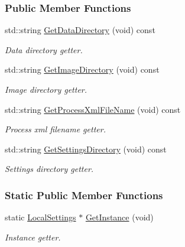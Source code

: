 \subsubsection*{Public Member Functions}
\begin{DoxyCompactItemize}
\item 
std\-::string \hyperlink{group___core_aaa62a3ad7984bb9b41d874a432f80eb5}{Get\-Data\-Directory} (void) const 
\begin{DoxyCompactList}\small\item\em Data directory getter. \end{DoxyCompactList}\item 
std\-::string \hyperlink{group___core_abbaecb0ce832b89c7851af0d7931cf89}{Get\-Image\-Directory} (void) const 
\begin{DoxyCompactList}\small\item\em Image directory getter. \end{DoxyCompactList}\item 
std\-::string \hyperlink{group___core_a2ab12f5691406aa7ad21140fd3a94f27}{Get\-Process\-Xml\-File\-Name} (void) const 
\begin{DoxyCompactList}\small\item\em Process xml filename getter. \end{DoxyCompactList}\item 
std\-::string \hyperlink{group___core_adfd6c887c7c35c76bce216dda592170d}{Get\-Settings\-Directory} (void) const 
\begin{DoxyCompactList}\small\item\em Settings directory getter. \end{DoxyCompactList}\end{DoxyCompactItemize}
\subsubsection*{Static Public Member Functions}
\begin{DoxyCompactItemize}
\item 
static \hyperlink{group___core_class_local_settings}{Local\-Settings} $\ast$ \hyperlink{group___core_a80f6e158e8c61b70fd4efec296e28310}{Get\-Instance} (void)
\begin{DoxyCompactList}\small\item\em Instance getter. \end{DoxyCompactList}\end{DoxyCompactItemize}
